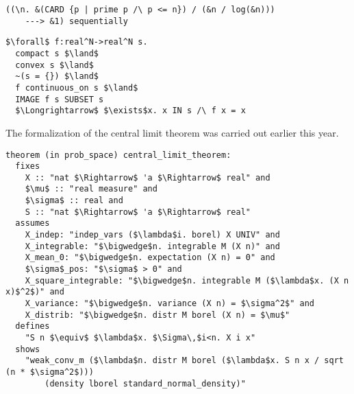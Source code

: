 \documentclass[brochure,english,12pt]{bourbaki}
\theoremstyle{plain}
\begin{document}
\begin{lstlisting}[keepspaces=true,stringstyle=\tt,basicstyle=\small,frame=single,framesep=8pt,mathescape,morekeywords={theorem,fixes,assumes,defines,shows,Variable,Theorem,Proof,Qed},columns=flexible,caption={The prime number theorem}]
  ((\n. &(CARD {p | prime p /\ p <= n}) / (&n / log(&n)))
    ---> &1) sequentially
\end{lstlisting}

\begin{lstlisting}[keepspaces=true,stringstyle=\tt,basicstyle=\small,frame=single,framesep=8pt,mathescape,morekeywords={theorem,fixes,assumes,defines,shows,Variable,Theorem,Proof,Qed},columns=flexible,caption={Brouwer fixed point formula}]
  $\forall$ f:real^N->real^N s. 
  compact s $\land$ 
  convex s $\land$
  ~(s = {}) $\land$
  f continuous_on s $\land$
  IMAGE f s SUBSET s
  $\Longrightarrow$ $\exists$x. x IN s /\ f x = x
\end{lstlisting}

The formalization of the central limit theorem was carried out earlier this year.

\begin{lstlisting}[keepspaces=true,stringstyle=\tt,basicstyle=\small,frame=single,framesep=8pt,mathescape,morekeywords={theorem,fixes,assumes,defines,shows,Variable,Theorem,Proof,Qed},columns=flexible,caption={The central limit theorem in Isabelle}]
theorem (in prob_space) central_limit_theorem:
  fixes 
    X :: "nat $\Rightarrow$ 'a $\Rightarrow$ real" and
    $\mu$ :: "real measure" and
    $\sigma$ :: real and
    S :: "nat $\Rightarrow$ 'a $\Rightarrow$ real"
  assumes
    X_indep: "indep_vars ($\lambda$i. borel) X UNIV" and
    X_integrable: "$\bigwedge$n. integrable M (X n)" and
    X_mean_0: "$\bigwedge$n. expectation (X n) = 0" and
    $\sigma$_pos: "$\sigma$ > 0" and
    X_square_integrable: "$\bigwedge$n. integrable M ($\lambda$x. (X n x)$^2$)" and
    X_variance: "$\bigwedge$n. variance (X n) = $\sigma^2$" and
    X_distrib: "$\bigwedge$n. distr M borel (X n) = $\mu$"
  defines
    "S n $\equiv$ $\lambda$x. $\Sigma\,$i<n. X i x"
  shows
    "weak_conv_m ($\lambda$n. distr M borel ($\lambda$x. S n x / sqrt (n * $\sigma^2$))) 
        (density lborel standard_normal_density)"
\end{lstlisting}

\end{document}
